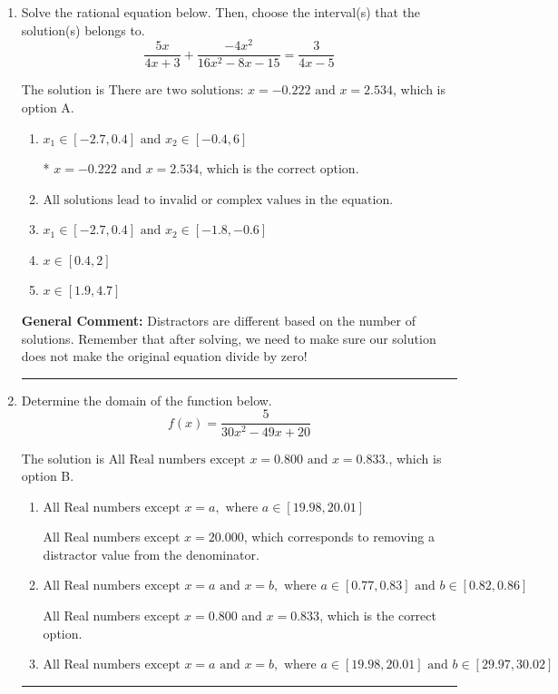\documentclass{extbook}[14pt]
\newcommand{\litem}[1]{\item #1

\rule{\textwidth}{0.4pt}}
\begin{document}
\begin{enumerate}\litem{
Solve the rational equation below. Then, choose the interval(s) that the solution(s) belongs to.
\[ \frac{5x}{4x + 3} + \frac{-4x^{2}}{16x^{2} -8 x -15} = \frac{3}{4x -5} \]

The solution is \( \text{There are two solutions: } x = -0.222 \text{ and } x = 2.534 \), which is option A.\begin{enumerate}[label=\Alph*.]
\item \( x_1 \in [-2.7, 0.4] \text{ and } x_2 \in [-0.4,6] \)

* $x = -0.222 \text{ and } x = 2.534$, which is the correct option.
\item \( \text{All solutions lead to invalid or complex values in the equation.} \)


\item \( x_1 \in [-2.7, 0.4] \text{ and } x_2 \in [-1.8,-0.6] \)


\item \( x \in [0.4,2] \)


\item \( x \in [1.9,4.7] \)


\end{enumerate}

\textbf{General Comment:} Distractors are different based on the number of solutions. Remember that after solving, we need to make sure our solution does not make the original equation divide by zero!
}
\litem{
Determine the domain of the function below.
\[ f(x) = \frac{5}{30x^{2} -49 x + 20} \]

The solution is \( \text{All Real numbers except } x = 0.800 \text{ and } x = 0.833. \), which is option B.\begin{enumerate}[label=\Alph*.]
\item \( \text{All Real numbers except } x = a, \text{ where } a \in [19.98, 20.01] \)

All Real numbers except $x = 20.000$, which corresponds to removing a distractor value from the denominator.
\item \( \text{All Real numbers except } x = a \text{ and } x = b, \text{ where } a \in [0.77, 0.83] \text{ and } b \in [0.82, 0.86] \)

All Real numbers except $x = 0.800$ and $x = 0.833$, which is the correct option.
\item \( \text{All Real numbers except } x = a \text{ and } x = b, \text{ where } a \in [19.98, 20.01] \text{ and } b \in [29.97, 30.02] \)


\end{enumerate}}
\end{enumerate}
\end{document}
